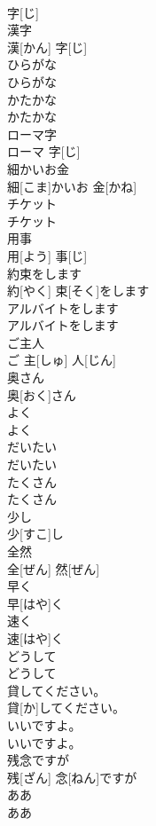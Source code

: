 \documentclass[8pt]{extreport}
\begin{document}
\begin{CJK}{UTF8}{min}
\\	字[じ]		
\\	漢字	
\\	漢[かん] 字[じ]		
\\	ひらがな	
\\	ひらがな		
\\	かたかな	
\\	かたかな		
\\	ローマ字	
\\	ローマ 字[じ]		
\\	細かいお金	
\\	細[こま]かいお 金[かね]		
\\	チケット	
\\	チケット		
\\	用事	
\\	用[よう] 事[じ]		
\\	約束をします	
\\	約[やく] 束[そく]をします		
\\	アルバイトをします	
\\	アルバイトをします		
\\	ご主人	
\\	ご 主[しゅ] 人[じん]		
\\	奥さん	
\\	奥[おく]さん		
\\	よく	
\\	よく		
\\	だいたい	
\\	だいたい		
\\	たくさん	
\\	たくさん		
\\	少し	
\\	少[すこ]し		
\\	全然	
\\	全[ぜん] 然[ぜん]		
\\	早く	
\\	早[はや]く		
\\	速く	
\\	速[はや]く		
\\	どうして	
\\	どうして		
\\	貸してください。	
\\	貸[か]してください。		
\\	いいですよ。	
\\	いいですよ。		
\\	残念ですが	
\\	残[ざん] 念[ねん]ですが		
\\	ああ	
\\	ああ		

\end{CJK}
\end{document}
